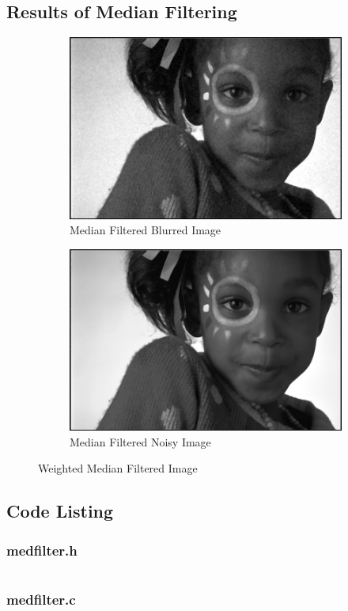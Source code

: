 \documentclass{article}
\begin{document}
\subsection{Results of Median Filtering}
	\begin{figure}[h]
		\begin{subfigure}{0.5\textwidth}
			\includegraphics[width=1.0\textwidth]{cnon.png}
			\caption{Median Filtered Blurred Image}
		\end{subfigure}
		\begin{subfigure}{0.5\textwidth}
			\includegraphics[width=1.0\textwidth]{cnsp.png}
			\caption{Median Filtered Noisy Image}
		\end{subfigure}
		\caption{Weighted Median Filtered Image}
	\end{figure}

\subsection{Code Listing}
	\subsubsection{medfilter.h}
		\inputminted[tabsize=4]{c}{medfilter.h}
	\subsubsection{medfilter.c}
		\inputminted[tabsize=4]{c}{medfilter.c}
\end{document}
